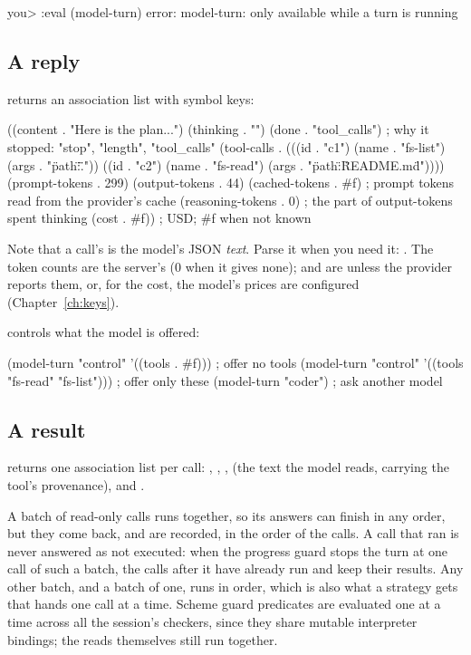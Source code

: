 \begin{txt}
you> :eval (model-turn)
error: model-turn: only available while a turn is running
\end{txt}

\subsection{A reply}

 returns an association list with symbol keys:

\begin{scm}
((content . "Here is the plan...")
 (thinking . "")
 (done . "tool_calls")         ; why it stopped: "stop", "length", "tool_calls"
 (tool-calls . (((id . "c1") (name . "fs-list") (args . "{\"path\":\".\"}"))
                ((id . "c2") (name . "fs-read") (args . "{\"path\":\"README.md\"}"))))
 (prompt-tokens . 299)
 (output-tokens . 44)
 (cached-tokens . #f)          ; prompt tokens read from the provider's cache
 (reasoning-tokens . 0)        ; the part of output-tokens spent thinking
 (cost . #f))                  ; USD; #f when not known
\end{scm}

Note that a call's  is the model's JSON \emph{text}. Parse it
when you need it: . The
token counts are the server's (0 when it gives none); 
and  are  unless the provider reports them, or, for the
cost, the model's prices are configured (Chapter~\ref{ch:keys}).

 controls what the model is offered:

\begin{scm}
(model-turn "control" '((tools . #f)))                 ; offer no tools
(model-turn "control" '((tools "fs-read" "fs-list")))  ; offer only these
(model-turn "coder")                                   ; ask another model
\end{scm}

\subsection{A result}

 returns one association list per call:
, , ,  (the text the model reads,
carrying the tool's provenance),  and .

A batch of read-only calls runs together, so its answers can finish in any
order, but they come back, and are recorded, in the order of the calls. A
call that ran is never answered as not executed: when the progress guard
stops the turn at one call of such a batch, the calls after it have already
run and keep their results. Any other batch, and a batch of one, runs in order,
which is also what a strategy gets that hands  one call at a
time. Scheme guard predicates are evaluated one at a time across all the
session's checkers, since they share mutable interpreter bindings; the reads
themselves still run together.

